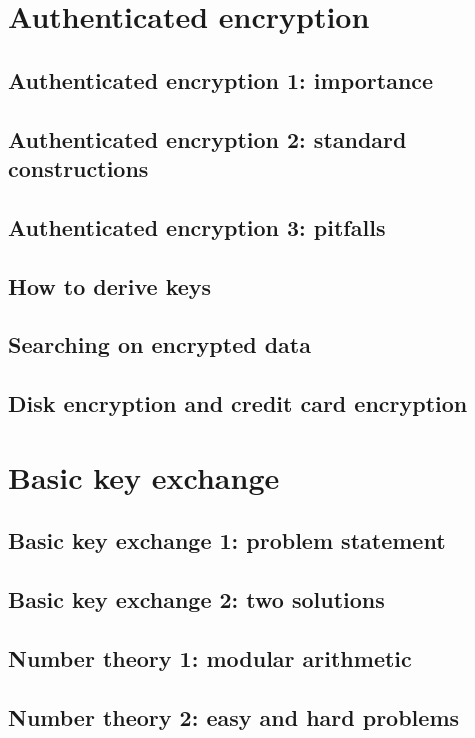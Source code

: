 \documentclass[10pt,a4paper]{report}
\begin{document}
\chapter{Authenticated encryption}

\section{Authenticated encryption 1: importance}
\section{Authenticated encryption 2: standard constructions}
\section{Authenticated encryption 3: pitfalls}
\section{How to derive keys}
\section{Searching on encrypted data}
\section{Disk encryption and credit card encryption}

\chapter{Basic key exchange}

\section{Basic key exchange 1: problem statement}
\section{Basic key exchange 2: two solutions}
\section{Number theory 1: modular arithmetic}
\section{Number theory 2: easy and hard problems}
\end{document}

